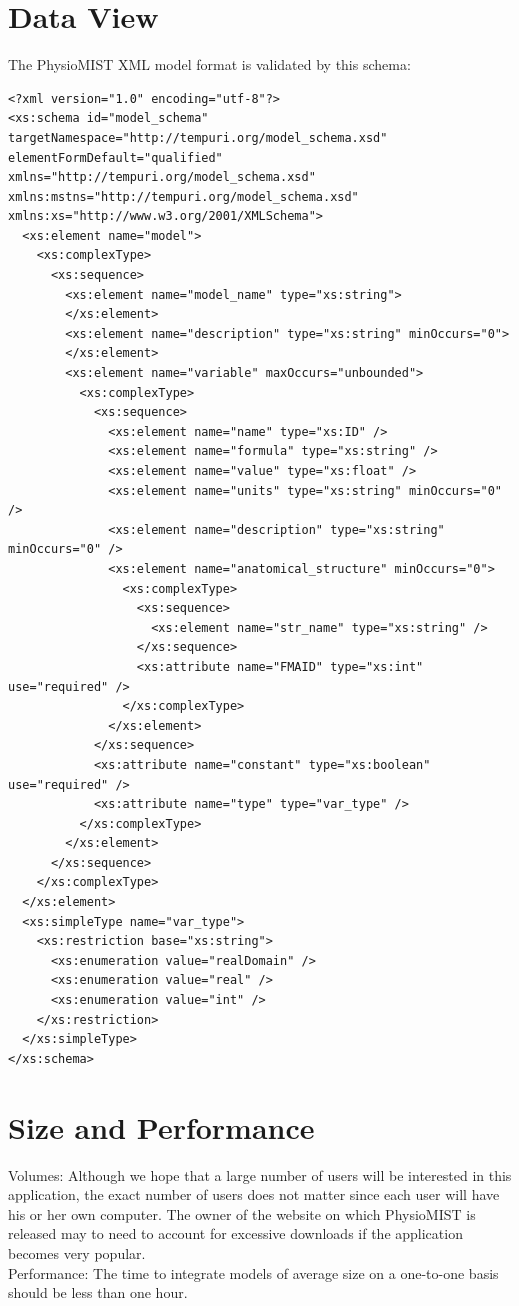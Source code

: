 \documentclass{article}
\begin{document}
\section{Data View}
The PhysioMIST XML model format is validated by this schema:

\begin{verbatim}
<?xml version="1.0" encoding="utf-8"?>
<xs:schema id="model_schema" targetNamespace="http://tempuri.org/model_schema.xsd"
elementFormDefault="qualified" xmlns="http://tempuri.org/model_schema.xsd"
xmlns:mstns="http://tempuri.org/model_schema.xsd"
xmlns:xs="http://www.w3.org/2001/XMLSchema">
  <xs:element name="model">
    <xs:complexType>
      <xs:sequence>
        <xs:element name="model_name" type="xs:string">
        </xs:element>
        <xs:element name="description" type="xs:string" minOccurs="0">
        </xs:element>
        <xs:element name="variable" maxOccurs="unbounded">
          <xs:complexType>
            <xs:sequence>
              <xs:element name="name" type="xs:ID" />
              <xs:element name="formula" type="xs:string" />
              <xs:element name="value" type="xs:float" />
              <xs:element name="units" type="xs:string" minOccurs="0" />
              <xs:element name="description" type="xs:string" minOccurs="0" />
              <xs:element name="anatomical_structure" minOccurs="0">
                <xs:complexType>
                  <xs:sequence>
                    <xs:element name="str_name" type="xs:string" />
                  </xs:sequence>
                  <xs:attribute name="FMAID" type="xs:int" use="required" />
                </xs:complexType>
              </xs:element>
            </xs:sequence>
            <xs:attribute name="constant" type="xs:boolean" use="required" />
            <xs:attribute name="type" type="var_type" />
          </xs:complexType>
        </xs:element>
      </xs:sequence>
    </xs:complexType>
  </xs:element>
  <xs:simpleType name="var_type">
    <xs:restriction base="xs:string">
      <xs:enumeration value="realDomain" />
      <xs:enumeration value="real" />
      <xs:enumeration value="int" />
    </xs:restriction>
  </xs:simpleType>
</xs:schema>
\end{verbatim}

\section{Size and Performance}
Volumes:
\newline
Although we hope that a large number of users will be interested in this application, the exact number of users does not matter since each user will have his or her own computer.  The owner of the website on which PhysioMIST is released may to need to account for excessive downloads if the application becomes very popular.\\
Performance:
\newline
The time to integrate models of average size on a one-to-one basis should be less than one hour.
\end{document}
